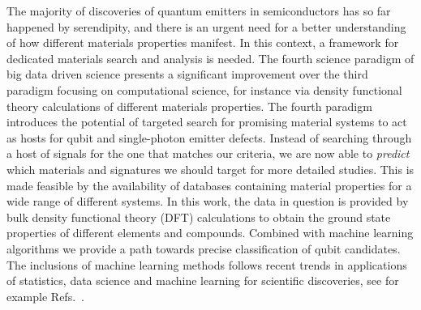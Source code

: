 \documentclass[superscriptaddress,unsortedaddress,
 amsmath,amssymb,
 aps,
]{revtex4-2}
\begin{document}
The majority of discoveries of quantum emitters in semiconductors has so far happened by serendipity, and there is an urgent need for 
a better understanding of how different materials properties manifest. 
In this context, a framework for dedicated materials search and analysis is needed. 
The fourth science paradigm of big data driven science presents a significant improvement over the third paradigm focusing on computational science, for instance via density functional theory calculations of different materials properties. The fourth paradigm 
introduces the potential of targeted search for promising material systems to act as hosts for qubit and single-photon emitter defects.  
Instead of searching through a host of signals for the one that matches our criteria, we are now able to \textit{predict} which materials and signatures we should target for more detailed studies. 
This is made feasible by the availability of databases containing material properties for a wide range of different systems. In this work, the data in question is provided by bulk density functional theory (DFT) calculations to obtain the ground state properties of different elements and compounds. Combined with machine learning algorithms we provide a path towards precise classification of qubit candidates. The inclusions of machine learning methods follows recent trends in applications of 
statistics, data science and machine learning for scientific discoveries, see for example Refs.~\cite{deiana2021,Carleo2019}.
\end{document}
